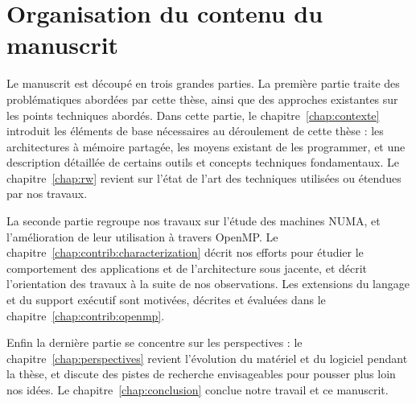 \section{Organisation du contenu du manuscrit}\label{sec:intro:outline}

Le manuscrit est découpé en trois grandes parties.
La première partie traite des problématiques abordées par cette thèse, ainsi que des approches existantes sur les points techniques abordés.
Dans cette partie, le chapitre~\ref{chap:contexte} introduit les éléments de base nécessaires au déroulement de cette thèse : les architectures à mémoire partagée, les moyens existant de les programmer, et une description détaillée de certains outils et concepts techniques fondamentaux.
Le chapitre~\ref{chap:rw} revient sur l'état de l'art des techniques utilisées ou étendues par nos travaux.

La seconde partie regroupe nos travaux sur l'étude des machines NUMA, et l'amélioration de leur utilisation à travers OpenMP.
Le chapitre~\ref{chap:contrib:characterization} décrit nos efforts pour étudier le comportement des applications et de l'architecture sous jacente, et décrit l'orientation des travaux à la suite de nos observations.
Les extensions du langage et du support exécutif sont motivées, décrites et évaluées dans le chapitre~\ref{chap:contrib:openmp}.

Enfin la dernière partie se concentre sur les perspectives : le chapitre~\ref{chap:perspectives} revient l'évolution du matériel et du logiciel pendant la thèse, et discute des pistes de recherche envisageables pour pousser plus loin nos idées. Le chapitre~\ref{chap:conclusion} conclue notre travail et ce manuscrit.
